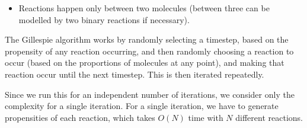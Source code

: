 \begin{enumerate}[label=(\alph*)]
\begin{itemize}
      \item
        Reactions happen only between two molecules (between three can be modelled by two binary reactions if necessary).
    \end{itemize}

    The Gillespie algorithm works by randomly selecting a timestep, based on the propensity of any reaction occurring, and then randomly choosing a reaction to occur (based on the proportions of molecules at any point), and making that reaction occur until the next timestep. This is then iterated repeatedly.

    Since we run this for an independent number of iterations, we consider only the complexity for a single iteration. For a single iteration, we have to generate propensities of each reaction, which takes $O(N)$ time with $N$ different reactions.
        
\end{enumerate}

